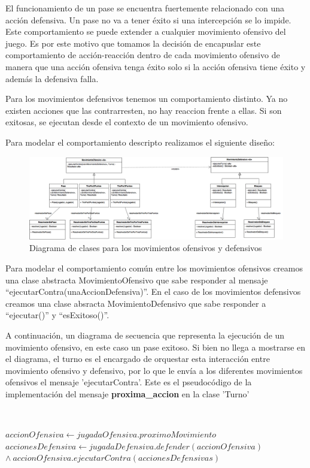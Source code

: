El funcionamiento de un pase se encuentra fuertemente relacionado con una acción defensiva.
Un pase no va a tener éxito si una intercepción se lo impide. Este comportamiento se puede extender a cualquier movimiento ofensivo del juego.
Es por este motivo que tomamos la decisión de encapuslar este comportamiento de acción-reacción dentro de cada movimiento ofensivo
de manera que una acción ofensiva tenga éxito solo si la acción ofensiva tiene éxito y además la defensiva falla. 

Para los movimientos defensivos tenemos un comportamiento distinto. Ya no existen acciones que las contrarresten, no hay reaccion frente a ellas.
Si son exitosas, se ejecutan desde el contexto de un movimiento ofensivo. 

Para modelar el comportamiento descripto realizamos el siguiente diseño:

\begin{figure}[h!]
  \includegraphics[scale=0.30]{imagenes/diagrama-clases-movimiento.png}
  \caption{Diagrama de clases para los movimientos ofensivos y defensivos}
\end{figure}

Para modelar el comportamiento común entre los movimientos ofensivos creamos una clase abstracta MovimientoOfensivo que sabe responder al mensaje ``ejecutarContra(unaAccionDefensiva)''. En el caso de los movimientos defensivos creamos una clase absracta MovimientoDefensivo que sabe responder a ``ejecutar()'' y ``esExitoso()''. 

A continuación, un diagrama de secuencia que representa la ejecución de un movimiento ofensivo, en este caso un pase exitoso.
Si bien no llega a mostrarse en el diagrama, el turno es el encargado de orquestar esta interacción entre movimiento ofensivo y defensivo, por lo que le envía a los 
diferentes movimientos ofensivos el mensaje 'ejecutarContra'. Este es el pseudocódigo de la implementación del mensaje \textbf{proxima\_accion} en la clase 'Turno'

~

\begin{algorithmic} 
  \State $accionOfensiva\gets jugadaOfensiva.proximoMovimiento$
  \State $accionesDefensiva\gets jugadaDefensiva.defender(accionOfensiva)$
  \State $\wedge \ accionOfensiva.ejecutarContra(accionesDefensivas)$
	\EndFunction
\end{algorithmic}

